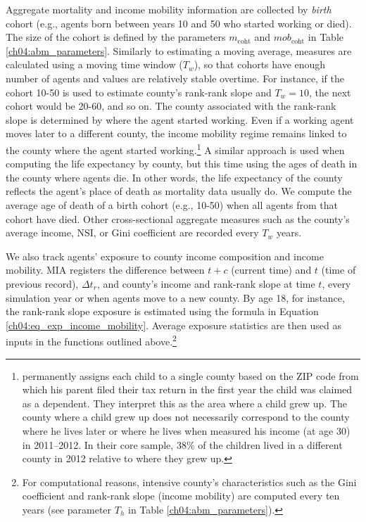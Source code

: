 \documentclass[class=article, crop=false, 12pt]{standalone}
\begin{document}
Aggregate mortality and income mobility information are collected by \textit{birth} cohort (e.g., agents born between years 10 and 50 who started working or died). The size of the cohort is defined by the parameters $m_{\text{coht}}$ and $mob_{\text{coht}}$ in Table \ref{ch04:abm_parameters}. Similarly to estimating a moving average, measures are calculated using a moving time window ($T_w$), so that cohorts have enough number of agents and values are relatively stable overtime. For instance, if the cohort 10-50 is used to estimate county's rank-rank slope and $T_w = 10$, the next cohort would be 20-60, and so on. The county associated with the rank-rank slope is determined by where the agent started working. Even if a working agent moves later to a different county, the income mobility regime remains linked to the county where the agent started working.\footnote{\citet{chetty2014} permanently assigns each child to a single county based on the ZIP code from which his parent filed their tax return in the first year the child was claimed as a dependent. They interpret this as the area where a child grew up. The county where a child grew up does not necessarily correspond to the county where he lives later or where he lives when \cite{chetty2014} measured his income (at age 30) in 2011–2012. In their core sample, 38\% of the children lived in a different county in 2012 relative to where they grew up.} A similar approach is used when computing the life expectancy by county, but this time using the ages of death in the county where agents die. In other words, the life expectancy of the county reflects the agent's place of death as mortality data usually do. We compute the average age of death of a birth cohort (e.g., 10-50) when all agents from that cohort have died. Other cross-sectional aggregate measures such as the county's average income, NSI, or Gini coefficient are recorded every $T_w$ years. 

We also track agents' exposure to county income composition and income mobility. MIA registers the difference between $t+c$ (current time) and $t$ (time of previous record), $\Delta t_r$, and county's income and rank-rank slope at time $t$, every simulation year or when agents move to a new county. By age 18, for instance, the  rank-rank slope exposure is estimated using the formula in Equation \ref{ch04:eq_exp_income_mobility}. Average exposure statistics are then used as inputs in the functions outlined above.\footnote{For computational reasons, intensive county's characteristics such as the Gini coefficient and rank-rank slope (income mobility) are computed every ten years (see parameter $T_h$ in Table \ref{ch04:abm_parameters}).} 
\end{document}
